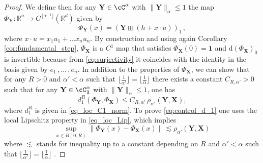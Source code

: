 \documentclass[12pt,a4paper]{article}
\numberwithin{equation}{section}
\def\fX{\mathbf{X}}
\def\fY{\mathbf{Y}}\newcommand{\norm}[1]{\left\lVert#1\right\rVert}
\theoremstyle{plain}
\theoremstyle{definition}
\theoremstyle{remark}
\begin{document}
\begin{proof}
 We define then for any $\fY\in  \cC^{\alpha}$ with $\|\fY\|_{\alpha} \leq 1$ the map $\Phi_\fY\colon \mathbb R^n\to G^{\lfloor \alpha^{-1} \rfloor}(\mathbb{R}^d) $ given by 
\[
	\Phi_\fY(x)=(\fY\boxplus (h+x\cdot u))_{1}\,,
\]
where $x\cdot u=x_1u_1+\dots x_n u_n$. By construction and using again Corollary \ref{cor:fundamental_step}, $\Phi_\fX$ is a $C^1$ map that satisfies $\Phi_\fX(0)=\mathbf{1}$ and $\mathrm{d}(\Phi_\fX)_0$ is invertible because from \eqref{eq:surjectivity} it coincides with the identity in the basis given by $e_1\,,\ldots \,,e_n$.  In addition to the properties of $\Phi_\fX$, we can show that for any $R>0$ and $\alpha' < \alpha$ such that $\lfloor \frac{1}{\alpha'} \rfloor=\lfloor \frac{1}{\alpha}  \rfloor $ there exists a constant $C_{R,\alpha'}>0$ such that for any $\fY \in \cC^{{\alpha}}_{\mathbf{1}}$ with $\|\fY\|_{\alpha} \le 1$, one has
\begin{equation}\label{eq:control_d_1}
d_1^R(\Phi_\fY,\Phi_\fX) \le C_{R,\alpha'} \, \rho_{\alpha'}(\fY,\fX),
\end{equation}
where $d_1^R$ is given in \eqref{eq_loc_C1_norm}. To prove \eqref{eq:control_d_1} one uses the local Lipschitz property in 
\eqref{eq_loc_Lip}, which implies
\begin{equation}\label{first_bound}
\sup_{x \in B(0,R)} \|\Phi_\fY(x)-\Phi_\fX(x)\|\lesssim \rho_{\alpha'}(\fY,\fX)
\end{equation}
where $\lesssim$ stands for inequality up to a constant depending on $R$ and $\alpha'<\alpha$ such that $\lfloor \frac{1}{\alpha'} \rfloor=\lfloor \frac{1}{\alpha}  \rfloor $ .


\end{proof}
\end{document}
